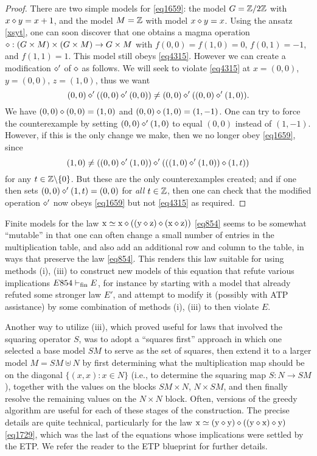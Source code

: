 \begin{proof}  There are two simple models for \eqref{eq1659}: the model $G = \mathbb{Z}/2\mathbb{Z}$ with $x \diamond y = x+1$, and the model $M = \mathbb{Z}$ with model $x \diamond y = x$.  Using the ansatz \eqref{xsyt}, one can soon discover that one obtains a magma operation $\diamond: (G \times M) \times (G \times M) \to G \times M$ with $f(0,0)=f(1,0)=0$, $f(0,1)=-1$, and $f(1,1)=1$.  This model still obeys \eqref{eq4315}. However we can create a modification $\diamond'$ of $\diamond$ as follows.  We will seek to violate \eqref{eq4315} at $x = (0,0)$, $y = (0,0)$, $z = (1,0)$, thus we want
$$ (0,0) \diamond' ((0,0) \diamond' (0,0)) \neq (0,0) \diamond' ((0,0) \diamond' (1,0)).$$
We have $(0,0) \diamond (0,0) = (1,0)$ and $(0,0) \diamond (1,0) = (1,-1)$.  One can try to force the counterexample by setting $(0,0) \diamond' (1,0)$ to equal $(0,0)$ instead of $(1,-1)$. However, if this is the only change we make, then we no longer obey \eqref{eq1659}, since
$$ (1,0) \neq ((0,0) \diamond' (1,0)) \diamond' (((1,0) \diamond' (1,0)) \diamond (1,t))$$
for any $t \in \mathbb{Z} \backslash \{0\}$. But these are the only counterexamples created; and if one then sets $(0,0) \diamond' (1,t) = (0,0)$ for \emph{all} $t \in \mathbb{Z}$, then one can check that the modified operation $\diamond'$ now obeys \eqref{eq1659} but not \eqref{eq4315} as required.
\end{proof}

Finite models for the law $\mathrm{x} \simeq \mathrm{x} \diamond ((\mathrm{y} \diamond \mathrm{z}) \diamond (\mathrm{x} \diamond \mathrm{z}))$ \eqref{eq854} seems to be somewhat ``mutable'' in that one can often change a small number of entries in the multiplication table, and also add an additional row and column to the table, in ways that preserve the law \eqref{eq854}.  This renders this law suitable for using methods (i), (iii) to construct new models of this equation that refute various implications $E854 \vdash_{\mathrm{fin}} E$, for instance by starting with a model that already refuted some stronger law $E'$, and attempt to modify it (possibly with ATP assistance) by some combination of methods (i), (iii) to then violate $E$. 

Another way to utilize (iii), which proved useful for laws that involved the squaring operator $S$, was to adopt a ``squares first'' approach in which one selected a base model $SM$ to serve as the set of squares, then extend it to a larger model $M = SM \uplus N$ by first determining what the multiplication map should be on the diagonal $\{ (x,x): x\in N\}$ (i.e., to determine the squaring map $S \colon N \to SM$), together with the values on the blocks $SM \times N$, $N \times SM$, and then finally resolve the remaining values on the $N \times N$ block.  Often, versions of the greedy algorithm are useful for each of these stages of the construction.  The precise details are quite technical, particularly for the law $\mathrm{x} \simeq (\mathrm{y} \diamond \mathrm{y}) \diamond ((\mathrm{y} \diamond \mathrm{x}) \diamond \mathrm{y})$ \eqref{eq1729}, which was the last of the equations whose implications were settled by the ETP.  We refer the reader to the ETP blueprint for further details.
